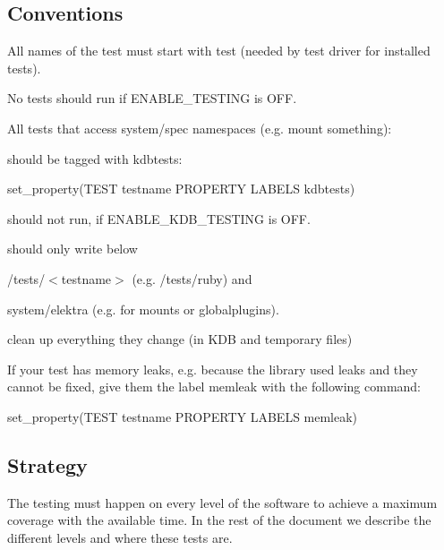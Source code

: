 \subsection*{Conventions}


\begin{DoxyItemize}
\item All names of the test must start with test (needed by test driver for installed tests).
\item No tests should run if E\+N\+A\+B\+L\+E\+\_\+\+T\+E\+S\+T\+I\+NG is O\+FF.
\item All tests that access system/spec namespaces (e.\+g. mount something)\+:
\begin{DoxyItemize}
\item should be tagged with {\ttfamily kdbtests}\+: \begin{DoxyVerb} set_property(TEST testname PROPERTY LABELS kdbtests)
\end{DoxyVerb}

\item should not run, if {\ttfamily E\+N\+A\+B\+L\+E\+\_\+\+K\+D\+B\+\_\+\+T\+E\+S\+T\+I\+NG} is O\+FF.
\item should only write below
\begin{DoxyItemize}
\item {\ttfamily /tests/$<$testname$>$} (e.\+g. {\ttfamily /tests/ruby}) and
\item {\ttfamily system/elektra} (e.\+g. for mounts or globalplugins).
\end{DoxyItemize}
\item clean up everything they change (in K\+DB and temporary files)
\end{DoxyItemize}
\item If your test has memory leaks, e.\+g. because the library used leaks and they cannot be fixed, give them the label {\ttfamily memleak} with the following command\+: \begin{DoxyVerb}  set_property(TEST testname PROPERTY LABELS memleak)
\end{DoxyVerb}

\end{DoxyItemize}

\subsection*{Strategy}

The testing must happen on every level of the software to achieve a maximum coverage with the available time. In the rest of the document we describe the different levels and where these tests are.

